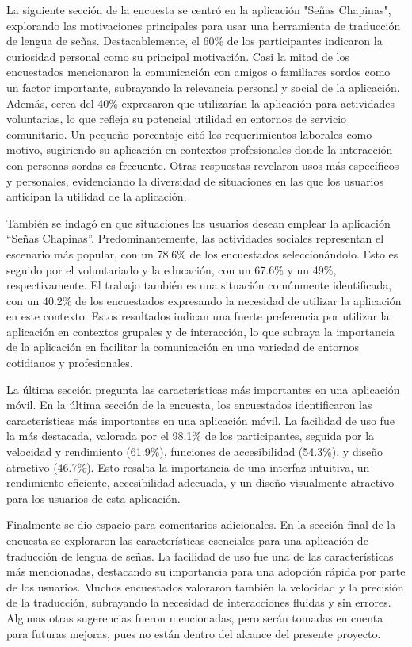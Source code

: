 La siguiente sección de la encuesta se centró en la aplicación "Señas Chapinas", explorando las motivaciones principales para usar una herramienta de traducción de lengua de señas. Destacablemente, el 60\% de los participantes indicaron la curiosidad personal como su principal motivación. Casi la mitad de los encuestados mencionaron la comunicación con amigos o familiares sordos como un factor importante, subrayando la relevancia personal y social de la aplicación. Además, cerca del 40\% expresaron que utilizarían la aplicación para actividades voluntarias, lo que refleja su potencial utilidad en entornos de servicio comunitario. Un pequeño porcentaje citó los requerimientos laborales como motivo, sugiriendo su aplicación en contextos profesionales donde la interacción con personas sordas es frecuente. Otras respuestas revelaron usos más específicos y personales, evidenciando la diversidad de situaciones en las que los usuarios anticipan la utilidad de la aplicación.

También se indagó en que situaciones los usuarios desean emplear la aplicación ``Señas Chapinas''. Predominantemente, las actividades sociales representan el escenario más popular, con un 78.6\% de los encuestados seleccionándolo. Esto es seguido por el voluntariado y la educación, con un 67.6\% y un 49\%, respectivamente. El trabajo también es una situación comúnmente identificada, con un 40.2\% de los encuestados expresando la necesidad de utilizar la aplicación en este contexto. Estos resultados indican una fuerte preferencia por utilizar la aplicación en contextos grupales y de interacción, lo que subraya la importancia de la aplicación en facilitar la comunicación en una variedad de entornos cotidianos y profesionales.

La última sección pregunta las características más importantes en una aplicación móvil. En la última sección de la encuesta, los encuestados identificaron las características más importantes en una aplicación móvil. La facilidad de uso fue la más destacada, valorada por el 98.1\% de los participantes, seguida por la velocidad y rendimiento (61.9\%), funciones de accesibilidad (54.3\%), y diseño atractivo (46.7\%). Esto resalta la importancia de una interfaz intuitiva, un rendimiento eficiente, accesibilidad adecuada, y un diseño visualmente atractivo para los usuarios de esta aplicación. 

Finalmente se dio espacio para comentarios adicionales. En la sección final de la encuesta se exploraron las características esenciales para una aplicación de traducción de lengua de señas. La facilidad de uso fue una de las características más mencionadas, destacando su importancia para una adopción rápida por parte de los usuarios. Muchos encuestados valoraron también la velocidad y la precisión de la traducción, subrayando la necesidad de interacciones fluidas y sin errores. Algunas otras sugerencias fueron mencionadas, pero serán tomadas en cuenta para futuras mejoras, pues no están dentro del alcance del presente proyecto. 

